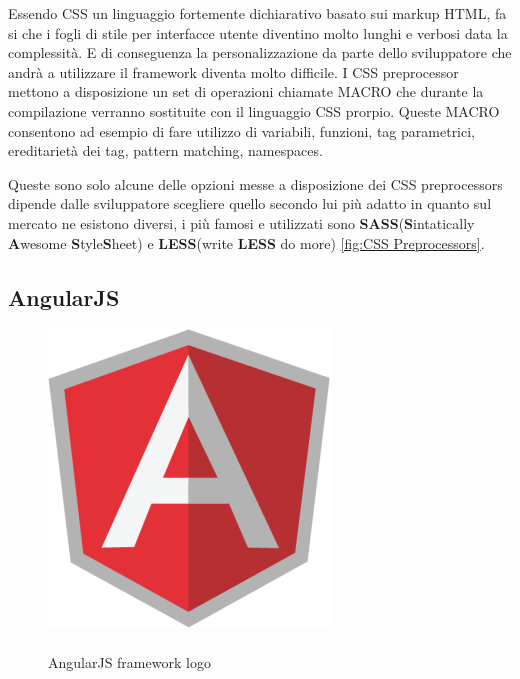 Essendo CSS un linguaggio fortemente dichiarativo basato sui markup HTML, fa si che i fogli di stile per interfacce utente diventino molto lunghi e verbosi data la complessità. E di conseguenza la personalizzazione da parte dello sviluppatore che andrà a utilizzare il framework diventa molto difficile.
I CSS preprocessor mettono a disposizione un set di operazioni chiamate MACRO che durante la compilazione verranno sostituite con il linguaggio CSS prorpio. Queste MACRO consentono ad esempio di fare utilizzo di variabili, funzioni, tag parametrici, ereditarietà dei tag, pattern matching, namespaces.

Queste sono solo alcune delle opzioni messe a disposizione dei CSS preprocessors dipende dalle sviluppatore scegliere quello secondo lui più adatto in quanto sul mercato ne esistono diversi, i più famosi e utilizzati sono \textbf{SASS}(\textbf{S}intatically \textbf{A}wesome \textbf{S}tyle\textbf{S}heet) e \textbf{LESS}(write \textbf{LESS} do more) \ref{fig:CSS Preprocessors}.

\subsection{AngularJS}
\label{sec:angularjs}
\begin{figure}
  \vspace{-65pt}
  \begin{center}
    \includegraphics[scale=0.40]{Figures/angular-logo.png}
  \end{center}
  \vspace{-10pt}
  \caption{\\AngularJS framework logo}
  \label{fig:AngularJS}
  \vspace{10pt}
\end{figure}

